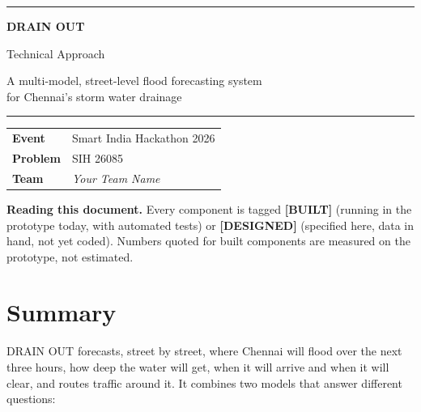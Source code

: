 \documentclass[11pt,a4paper]{article}
\newcommand{\built}{\textcolor{built}{\small\textbf{[BUILT]}}}
\newcommand{\planned}{\textcolor{planned}{\small\textbf{[DESIGNED]}}}
\begin{document}
\begin{titlepage}
  \centering
  \vspace*{2.5cm}
  {\color{accent}\rule{\linewidth}{1.2pt}}\par\vspace{0.6cm}
  {\Huge\bfseries DRAIN OUT\par}
  \vspace{0.3cm}
  {\LARGE Technical Approach\par}
  \vspace{0.4cm}
  {\large A multi-model, street-level flood forecasting system\\ for Chennai's storm water drainage\par}
  \vspace{0.6cm}
  {\color{accent}\rule{\linewidth}{1.2pt}}\par
  \vspace{1.5cm}
  \begin{tabular}{@{}ll@{}}
    \textbf{Event}   & Smart India Hackathon 2026 \\
    \textbf{Problem} & SIH 26085 \\
    \textbf{Team}    & \emph{Your Team Name} \\
  \end{tabular}
  \vfill
  \begin{minipage}{0.85\linewidth}\small
  \textbf{Reading this document.} Every component is tagged \built{} (running in the
  prototype today, with automated tests) or \planned{} (specified here, data in hand,
  not yet coded). Numbers quoted for built components are measured on the prototype,
  not estimated.
  \end{minipage}
\end{titlepage}

\tableofcontents
\newpage

\section{Summary}

DRAIN OUT forecasts, street by street, where Chennai will flood over the next three
hours, how deep the water will get, when it will arrive and when it will clear, and
routes traffic around it. It combines two models that answer different questions:
\end{document}
